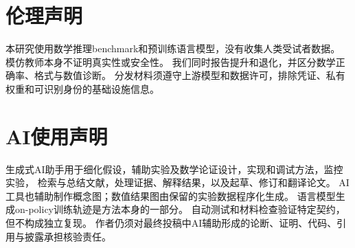 \section*{伦理声明}
本研究使用数学推理benchmark和预训练语言模型，没有收集人类受试者数据。
模仿教师本身不证明真实性或安全性。
我们同时报告提升和退化，并区分数学正确率、格式与数值诊断。
分发材料须遵守上游模型和数据许可，排除凭证、私有权重和可识别身份的基础设施信息。

\section*{AI使用声明}
生成式AI助手用于细化假设，辅助实验及数学论证设计，实现和调试方法，监控实验，
检索与总结文献，处理证据、解释结果，以及起草、修订和翻译论文。
AI工具也辅助制作概念图；数值结果图由保留的实验数据程序化生成。
语言模型生成on-policy训练轨迹是方法本身的一部分。
自动测试和材料检查验证特定契约，但不构成独立复现。
作者仍须对最终投稿中AI辅助形成的论断、证明、代码、引用与披露承担核验责任。
